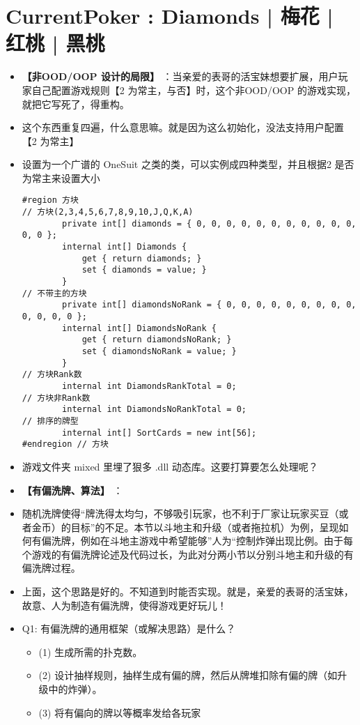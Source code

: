\documentclass[9pt, b5paper]{article}
\begin{document}
\section{CurrentPoker : Diamonds | 梅花 | 红桃 | 黑桃}
\label{sec-2}
\begin{itemize}
\item \textbf{【非OOD/OOP 设计的局限】} ：当亲爱的表哥的活宝妹想要扩展，用户玩家自己配置游戏规则【2 为常主，与否】时，这个非OOD/OOP 的游戏实现，就把它写死了，得重构。
\item 这个东西重复四遍，什么意思嘛。就是因为这么初始化，没法支持用户配置【2 为常主】
\item 设置为一个广谱的 OneSuit 之类的类，可以实例成四种类型，并且根据2 是否为常主来设置大小
\begin{verbatim}
#region 方块
// 方块(2,3,4,5,6,7,8,9,10,J,Q,K,A)
        private int[] diamonds = { 0, 0, 0, 0, 0, 0, 0, 0, 0, 0, 0, 0, 0 };
        internal int[] Diamonds {
            get { return diamonds; }
            set { diamonds = value; }
        }
// 不带主的方块
        private int[] diamondsNoRank = { 0, 0, 0, 0, 0, 0, 0, 0, 0, 0, 0, 0, 0 };
        internal int[] DiamondsNoRank {
            get { return diamondsNoRank; }
            set { diamondsNoRank = value; }
        }
// 方块Rank数
        internal int DiamondsRankTotal = 0;
// 方块非Rank数
        internal int DiamondsNoRankTotal = 0;
// 排序的牌型
        internal int[] SortCards = new int[56];
#endregion // 方块
\end{verbatim}
\item 游戏文件夹 mixed 里埋了狠多 .dll 动态库。这要打算要怎么处理呢？
\item \textbf{【有偏洗牌、算法】} ：
\item 随机洗牌使得“牌洗得太均匀，不够吸引玩家，也不利于厂家让玩家买豆（或者金币）的目标”的不足。本节以斗地主和升级（或者拖拉机）为例，呈现如何有偏洗牌，例如在斗地主游戏中希望能够”人为“控制炸弹出现比例。由于每个游戏的有偏洗牌论述及代码过长，为此对分两小节以分别斗地主和升级的有偏洗牌过程。
\item 上面，这个思路是好的。不知道到时能否实现。就是，亲爱的表哥的活宝妹，故意、人为制造有偏洗牌，使得游戏更好玩儿！
\item Q1: 有偏洗牌的通用框架（或解决思路）是什么？
\begin{itemize}
\item (1) 生成所需的扑克数。
\item (2) 设计抽样规则，抽样生成有偏的牌，然后从牌堆扣除有偏的牌（如升级中的炸弹）。
\item (3) 将有偏向的牌以等概率发给各玩家

\end{itemize}
\end{itemize}
\end{document}
